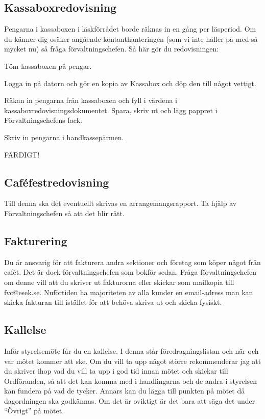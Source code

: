\documentclass[10pt]{article}
\begin{document}
\subsection{Kassaboxredovisning}
Pengarna i kassaboxen i läskförrådet borde räknas in en gång per läsperiod. Om du känner dig osäker angående kontanthanteringen (som vi inte håller på med så mycket nu) så fråga förvaltningschefen. Så här gör du redovisningen:
\begin{numplist}
    \item Töm kassaboxen på pengar.
    \item Logga in på datorn och gör en kopia av Kassabox och döp den till något vettigt.
    \item Räkan in pengarna från kassaboxen och fyll i värdena i kassaboxredovisningsdokumentet. Spara, skriv ut och lägg pappret i Förvaltningschefens fack.
    \item Skriv in pengarna i handkassepärmen.
    \item FÄRDIGT!
\end{numplist}

\subsection{Caféfestredovisning}
Till denna ska det eventuellt skrivas en arrangemangsrapport. Ta hjälp av Förvaltningschefen så att det blir rätt.

\subsection{Fakturering}
Du är ansvarig för att fakturera andra sektioner och företag som köper något från cafét. Det är dock förvaltningschefen som bokför sedan. Fråga förvaltningschefen om denne vill att du skriver ut fakturorna eller skickar som mailkopia till fvc@esek.se. Nuförtiden ha majoriteten av alla kunder en email-adress man kan skicka fakturan till istället för att behöva skriva ut och skicka fysiskt.

\subsection{Kallelse}
Inför styrelsemöte får du en kallelse. I denna står föredragningslistan och när och var mötet kommer att ske. Om du vill ta upp något större rekommenderar jag att du skriver ihop vad du vill ta upp i god tid innan mötet och skickar till Ordföranden, så att det kan komma med i handlingarna och de andra i styrelsen kan fundera på vad de tycker. Annars kan du lägga till punkten på mötet då dagordningen ska godkännas. Om det är oviktigt är det bara att säga det under ``Övrigt'' på mötet.
\end{document}
